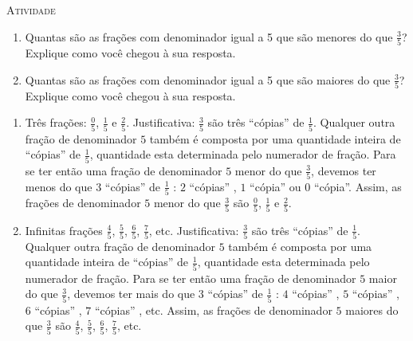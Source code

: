 \documentclass[10 pt,usenames,dvipsnames, oneside]{article}
\begin{document}
\bigskip
\begin{center}
{\large \scshape Atividade}
\end{center}
\fi

\begin{enumerate} %
  \item     Quantas são as frações com denominador igual a 5 que são menores do que $\frac{3}{5}$? Explique como você chegou à sua resposta.
  \item     Quantas são as frações com denominador igual a 5 que são maiores do que $\frac{3}{5}$? Explique como você chegou à sua resposta.
\end{enumerate} %

\ifdefined\prof
\begin{solucao}

\begin{enumerate}
\item       Três frações:       $\frac{0}{5}$,       $\frac{1}{5}$       e
$\frac{2}{5}$. Justificativa:       $\frac{3}{5}$       são três
``cópias''       de       $\frac{1}{5}$. Qualquer outra fração de denominador
$5$       também é composta por uma quantidade inteira de       ``cópias''
de       $\frac{1}{5}$, quantidade esta determinada pelo numerador de fração.
Para se ter então uma fração de denominador       $5$       menor do que
$\frac{3}{5}$, devemos ter menos do que       $3$             ``cópias''
de       $\frac{1}{5}$      :       $2$             ``cópias''      ,       $1$
   ``cópia''       ou       $0$             ``cópia''. Assim, as
frações de denominador       $5$       menor do que       $\frac{3}{5}$
são       $\frac{0}{5}$,       $\frac{1}{5}$       e       $\frac{2}{5}$.
\item       Infinitas frações       $\frac{4}{5}$,       $\frac{5}{5}$,
$\frac{6}{5}$,       $\frac{7}{5}$, etc. Justificativa:       $\frac{3}{5}$
são três       ``cópias''       de       $\frac{1}{5}$. Qualquer outra fração
de denominador       $5$       também é composta por uma quantidade inteira de
``cópias''       de       $\frac{1}{5}$, quantidade esta determinada pelo
numerador de fração. Para se ter então uma fração de denominador       $5$
maior do que       $\frac{3}{5}$, devemos ter mais do que       $3$
``cópias''       de       $\frac{1}{5}$      :       $4$             ``cópias''
,       $5$             ``cópias''      ,       $6$             ``cópias''
,       $7$             ``cópias''      , etc. Assim, as frações de
denominador       $5$       maiores do que       $\frac{3}{5}$       são
$\frac{4}{5}$,       $\frac{5}{5}$,       $\frac{6}{5}$,       $\frac{7}{5}$,
etc.

\end{enumerate}

\end{solucao}
\fi
\end{document}
